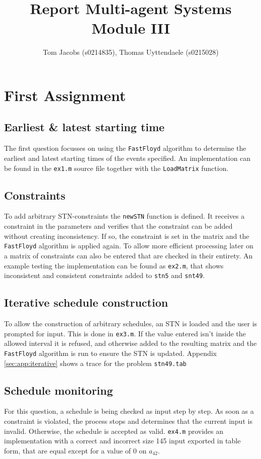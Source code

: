 \documentclass[10pt,a4paper]{article}
\title{Report Multi-agent Systems Module III}
\author{Tom Jacobs (s0214835), Thomas Uyttendaele (s0215028)}
\begin{document}
\maketitle
\tableofcontents

\section{First Assignment}
\subsection{Earliest \& latest starting time}
The first question focusses on using the \texttt{FastFloyd} algorithm to determine the earliest and latest starting times of the events specified. An implementation can be found in the \texttt{ex1.m} source file together with the \texttt{LoadMatrix} function.

\subsection{Constraints}
To add arbitrary STN-constraints the \texttt{newSTN} function is defined. It receives a constraint in the parameters and verifies that the constraint can be added without creating inconsistency. If so, the constraint is set in the matrix and the \texttt{FastFloyd} algorithm is applied again. To allow more efficient processing later on a matrix of constraints can also be entered that are checked in their entirety. An example testing the implementation can be found as \texttt{ex2.m}, that shows inconsistent and consistent constraints added to \texttt{stn5} and \texttt{snt49}.

\subsection{Iterative schedule construction}
\label{sec:iterative}
To allow the construction of arbitrary schedules, an STN is loaded and the user is prompted for input. This is done in \texttt{ex3.m}. If the value entered isn't inside the allowed interval it is refused, and otherwise added to the resulting matrix and the \texttt{FastFloyd} algorithm is run to ensure the STN is updated. Appendix \ref{sec:app:iterative} shows a trace for the problem \texttt{stn49.tab}

\subsection{Schedule monitoring}
For this question, a schedule is being checked as input step by step. As soon as a constraint is violated, the process stops and determines that the current input is invalid. Otherwise, the schedule is accepted as valid. \texttt{ex4.m} provides an implementation with a correct and incorrect size 145 input exported in table form, that are equal except for a value of 0 on $a_{42}$.
\end{document}
